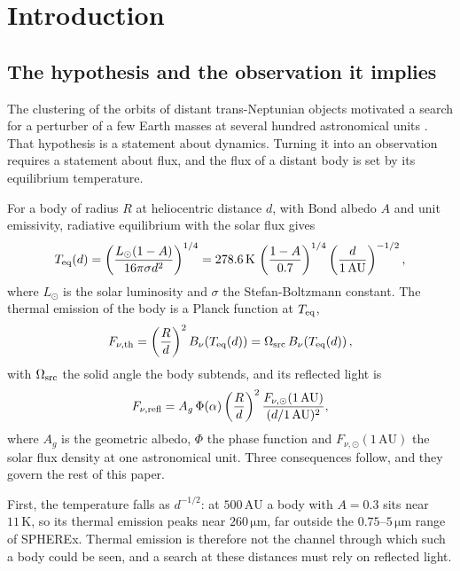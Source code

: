 \documentclass[11pt,a4paper]{article}
\newcommand{\unit}[1]{\,\mathrm{#1}}
\newcommand{\au}{\unit{AU}}
\begin{document}
\section{Introduction}

\subsection{The hypothesis and the observation it implies}
The clustering of the orbits of distant trans-Neptunian objects motivated a search
for a perturber of a few Earth masses at several hundred astronomical units
\citep{trujillo2014,batygin2016,brown2019,brown2021}. That hypothesis is a
statement about dynamics. Turning it into an observation requires a statement
about flux, and the flux of a distant body is set by its equilibrium temperature.

For a body of radius $R$ at heliocentric distance $d$, with Bond albedo $A$ and
unit emissivity, radiative equilibrium with the solar flux gives
\begin{equation}
T_{\rm eq}(d) = \left(\frac{L_\odot (1-A)}{16\pi\sigma d^{2}}\right)^{1/4}
= 278.6\unit{K}\,\left(\frac{1-A}{0.7}\right)^{1/4}
\left(\frac{d}{1\au}\right)^{-1/2},
\label{eq:teq}
\end{equation}
where $L_\odot$ is the solar luminosity and $\sigma$ the Stefan-Boltzmann
constant. The thermal emission of the body is a Planck function at $T_{\rm eq}$,
\begin{equation}
F_{\nu,\rm th} = \left(\frac{R}{d}\right)^{2} B_\nu\!\left(T_{\rm eq}(d)\right)
= \Omega_{\rm src}\,B_\nu\!\left(T_{\rm eq}(d)\right),
\label{eq:flux}
\end{equation}
with $\Omega_{\rm src}$ the solid angle the body subtends, and its reflected light is
\begin{equation}
F_{\nu,\rm refl} = A_g\,\Phi(\alpha)\left(\frac{R}{d}\right)^{2}
\frac{F_{\nu,\odot}(1\au)}{(d/1\au)^{2}},
\label{eq:refl}
\end{equation}
where $A_g$ is the geometric albedo, $\Phi$ the phase function and
$F_{\nu,\odot}(1\au)$ the solar flux density at one astronomical unit. Three
consequences follow, and they govern the rest of this paper.

First, the temperature falls as $d^{-1/2}$: at $500\au$ a body with $A=0.3$ sits
near $11\unit{K}$, so its thermal emission peaks near $260\unit{\mu m}$, far
outside the $0.75$--$5\unit{\mu m}$ range of SPHEREx. Thermal emission is
therefore not the channel through which such a body could be seen, and a search at
these distances must rely on reflected light.
\end{document}
